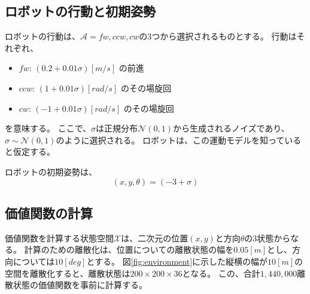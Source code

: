\subsection{ロボットの行動と初期姿勢}
ロボットの行動は、$\mathcal{A} = { fw, ccw, cw }$の3つから選択されるものとする。
行動はそれぞれ、
\begin{itemize}
  \item $fw$: $(0.2 + 0.01\sigma) \si{[m/s]}$ の前進
  \item $ccw$: $(1 + 0.01\sigma) \si{[rad/s]}$ のその場旋回
  \item $cw$: $(-1 + 0.01\sigma) \si{[rad/s]}$ のその場旋回
\end{itemize}
を意味する。
ここで、$\sigma$は正規分布$\mathcal{N}(0, 1)$から生成されるノイズであり、$\sigma \sim \mathcal{{N}}(0, 1)$のように選択される。
ロボットは、この運動モデルを知っていると仮定する。

ロボットの初期姿勢は、
\begin{equation}
\label{robot initial pose}
  (x, y, \theta) = (-3 + \sigma )
\end{equation}

\subsection{価値関数の計算}
価値関数を計算する状態空間$\mathcal{X}$は、二次元の位置$(x, y)$と方向$\theta$の3状態からなる。
計算のための離散化は、位置についての離散状態の幅を$0.05\si{[m]}$とし、方向については$10\si{[deg]}$とする。
図\ref{fig:environment}に示した縦横の幅が$10\si{[m]}$の空間を離散化すると、離散状態は$200 \times 200 \times 36$となる。
この、合計$1,440,000$離散状態の価値関数を事前に計算する。

